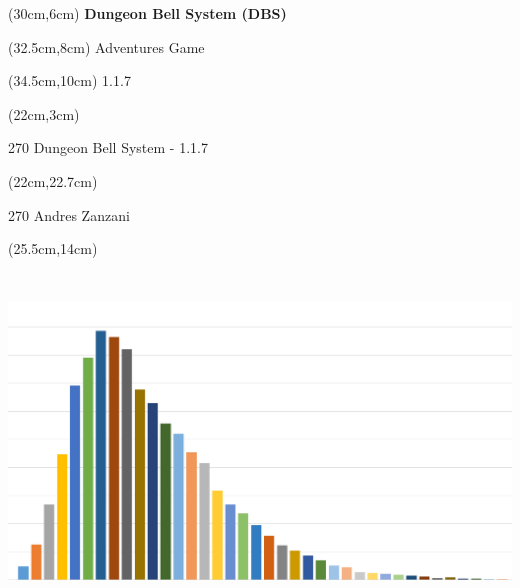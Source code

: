 \documentclass[10pt,a4paper]{article}
\def \versione {1.1.7}
\begin{document}
\pdfpagewidth=459.26mm
\thispagestyle{empty}

\begin{textblock*}{20cm}(30cm,6cm) %
\Huge \textbf{Dungeon Bell System (DBS)}\\

\end{textblock*}

\begin{textblock*}{20cm}(32.5cm,8cm) %
\calligra\Huge{Adventures Game}\\

\end{textblock*}

\begin{textblock*}{20cm}(34.5cm,10cm) %
		{\LARGE \versione}
\end{textblock*}

\begin{textblock*}{20cm}(22cm,3cm) %
\begin{turn}{270} 
	{\Huge Dungeon Bell System - \versione}\\
\end{turn}
\end{textblock*}


\begin{textblock*}{20cm}(22cm,22.7cm) %
\begin{turn}{270} 
	{\Huge Andres Zanzani}
\end{turn}
\end{textblock*}



\begin{textblock*}{20cm}(25.5cm,14cm) %
	\includegraphics[bb=0 0 1148 636,width=6.85139in,height=3.79514in]{copertina.png}
\end{textblock*}
\end{document}
